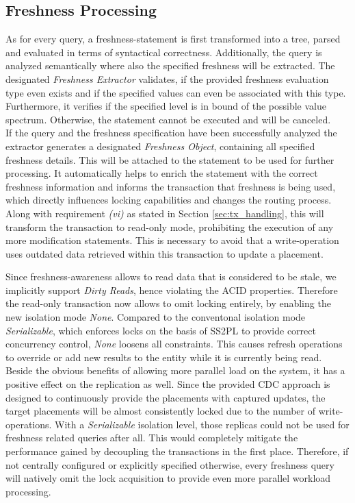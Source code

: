 
\subsection{Freshness Processing}
\label{sec:fresh_proc}

As for every query, a freshness-statement is first transformed into a tree, parsed and evaluated in terms of syntactical correctness. 
Additionally, the query is analyzed semantically where also the specified freshness will be extracted. The designated \textit{Freshness Extractor} 
validates, if the provided freshness evaluation type even exists and if the specified values can even be associated with this type.
Furthermore, it verifies if the specified level is in bound of the possible value spectrum. 
Otherwise, the statement cannot be executed and will be canceled.\\
If the query and the freshness specification have been successfully analyzed the extractor generates a designated \textit{Freshness Object}, 
containing all specified freshness details. This will be attached to the statement to be used for further processing.
It automatically helps to enrich the statement with the correct freshness information and informs the transaction that freshness is being used,
which directly influences locking capabilities and changes the routing process. 
Along with requirement \textit{(vi)} as stated in Section \ref{sec:tx_handling}, this will transform the transaction to read-only mode, prohibiting the execution of any more modification
statements. This is necessary to avoid that a write-operation uses outdated data retrieved within this transaction to update a placement.

Since freshness-awareness allows to read data that is considered to be stale, we implicitly support \emph{Dirty Reads}, hence violating the ACID properties.
Therefore the read-only transaction now allows to omit locking entirely, by enabling the new isolation mode \emph{None}. 
Compared to the conventonal isolation mode \emph{Serializable}, which enforces locks on the basis of SS2PL to provide correct concurrency control, \emph{None} 
loosens all constraints. This causes refresh operations to override or add new results to the entity while it is currently being read. 
Beside the obvious benefits of allowing more parallel load on the system, it has a positive effect on the replication as well.
Since the provided CDC approach is designed to continuously provide the placements with captured updates, the target placements will be almost consistently locked due 
to the number of write-operations.
With a \emph{Serializable} isolation level, those replicas could not be used for freshness related queries after all. 
This would completely mitigate the performance gained by decoupling the transactions in the first place. 
Therefore, if not centrally configured or explicitly specified otherwise, every freshness query will natively omit the lock acquisition to provide even more parallel workload processing.


